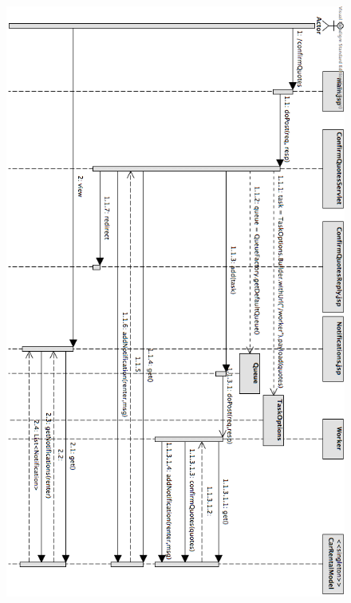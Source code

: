 \documentclass[11pt]{article}
\begin{document}
\begin{figure}[h]
  \centering
    \includegraphics[width=\textwidth,height=\textheight,keepaspectratio]{Sequence_Diagram}
\end{figure}

\end{document}
